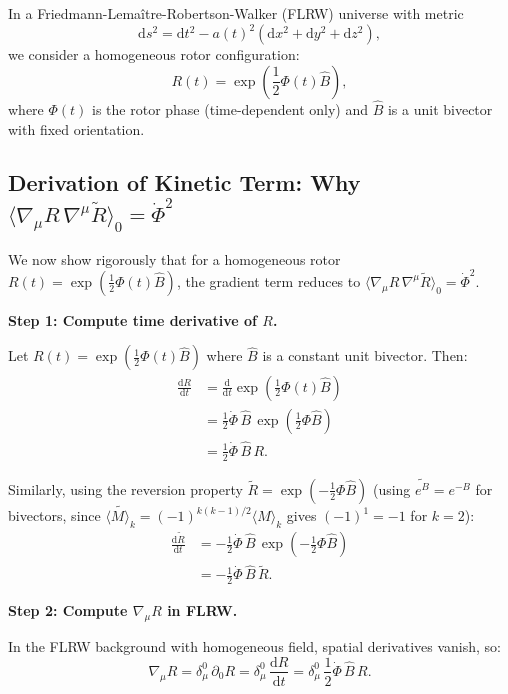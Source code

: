\documentclass[11pt,a4paper]{article}
\numberwithin{equation}{section}
\theoremstyle{plain}
\theoremstyle{definition}
\theoremstyle{remark}
\newcommand{\dd}{\mathrm{d}}
\begin{document}
In a Friedmann-Lemaître-Robertson-Walker (FLRW) universe with metric
\begin{equation}
\dd s^2 = \dd t^2 - a(t)^2\left(\dd x^2 + \dd y^2 + \dd z^2\right),
\end{equation}
we consider a homogeneous rotor configuration:
\begin{equation}
R(t) = \exp\left(\frac{1}{2}\Phi(t)\hat{B}\right),
\end{equation}
where $\Phi(t)$ is the rotor phase (time-dependent only) and $\hat{B}$ is a unit bivector with fixed orientation.

\subsection{Derivation of Kinetic Term: Why $\langle \nabla_\mu R\,\nabla^\mu \widetilde{R} \rangle_0 = \dot{\Phi}^2$}

We now show rigorously that for a homogeneous rotor $R(t) = \exp(\frac{1}{2}\Phi(t)\hat{B})$, the gradient term reduces to $\langle \nabla_\mu R\,\nabla^\mu \widetilde{R} \rangle_0 = \dot{\Phi}^2$.

\textbf{Step 1: Compute time derivative of $R$.}

Let $R(t) = \exp(\frac{1}{2}\Phi(t)\hat{B})$ where $\hat{B}$ is a constant unit bivector. Then:
\begin{align}
\frac{\dd R}{\dd t} &= \frac{\dd}{\dd t}\exp\left(\frac{1}{2}\Phi(t)\hat{B}\right)\\
&= \frac{1}{2}\dot{\Phi}\,\hat{B}\,\exp\left(\frac{1}{2}\Phi\hat{B}\right)\\
&= \frac{1}{2}\dot{\Phi}\,\hat{B}\,R.
\end{align}

Similarly, using the reversion property $\widetilde{R} = \exp(-\frac{1}{2}\Phi\hat{B})$ (using $\widetilde{e^B} = e^{-B}$ for bivectors, since $\widetilde{\langle M \rangle_k} = (-1)^{k(k-1)/2}\langle M \rangle_k$ gives $(-1)^1 = -1$ for $k=2$):
\begin{align}
\frac{\dd \widetilde{R}}{\dd t} &= -\frac{1}{2}\dot{\Phi}\,\hat{B}\,\exp\left(-\frac{1}{2}\Phi\hat{B}\right)\\
&= -\frac{1}{2}\dot{\Phi}\,\hat{B}\,\widetilde{R}.
\end{align}

\textbf{Step 2: Compute $\nabla_\mu R$ in FLRW.}

In the FLRW background with homogeneous field, spatial derivatives vanish, so:
\begin{equation}
\nabla_\mu R = \delta_\mu^0\,\partial_0 R = \delta_\mu^0\,\frac{\dd R}{\dd t} = \delta_\mu^0\,\frac{1}{2}\dot{\Phi}\,\hat{B}\,R.
\end{equation}
\end{document}
